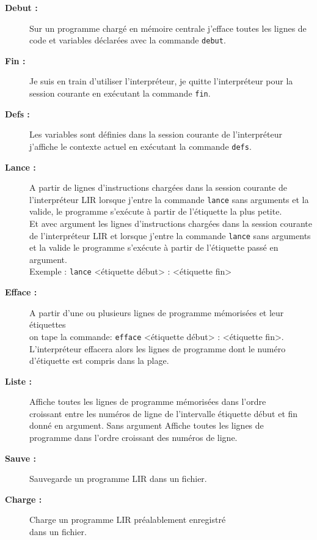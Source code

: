 \begin{description}
	\item[\textbf{Debut :}] Sur un programme chargé en mémoire centrale j'efface toutes les lignes de code et variables déclarées avec la commande \verb|debut|.
	
	\item[\textbf{Fin :}] Je suis en train d'utiliser l'interpréteur, je quitte l'interpréteur pour la session courante en exécutant la commande \verb|fin|.
	
	\item[\textbf{Defs :}] Les variables sont définies dans la session courante de l'interpréteur j'affiche le contexte actuel en exécutant la commande \verb|defs|.
	
	\item[\textbf{Lance :}] A partir de lignes d'instructions chargées dans la session courante de l'interpréteur LIR lorsque j'entre la commande \verb|lance| sans arguments et la valide, le programme s'exécute à partir de l'étiquette la plus petite.\\
	 Et avec argument les lignes d'instructions chargées dans la session courante de l'interpréteur LIR et lorsque j'entre la commande \verb|lance| sans arguments et la valide le programme s'exécute à partir de l'étiquette passé en argument.\\
	
	Exemple : \verb|lance| <étiquette début> : <étiquette fin>
	
	\item[\textbf{Efface :}] A partir d'une ou plusieurs lignes de programme mémorisées et leur étiquettes\\ on tape la commande: \verb|efface| <étiquette début> : <étiquette fin>.\\
	L'interpréteur effacera alors les lignes de programme dont le numéro d'étiquette est compris dans la plage.
	
	\item[\textbf{Liste :}] Affiche toutes les lignes de programme mémorisées dans l'ordre\\ croissant entre les numéros de ligne de l'intervalle étiquette début et fin donné en argument. Sans argument Affiche toutes les lignes de \\programme dans l'ordre croissant des numéros de ligne.
	
	\item[\textbf{Sauve :}] Sauvegarde un programme LIR dans un fichier.
	
	\item[\textbf{Charge :}] Charge un programme LIR préalablement enregistré \\ dans un fichier.
	
\end{description} 
